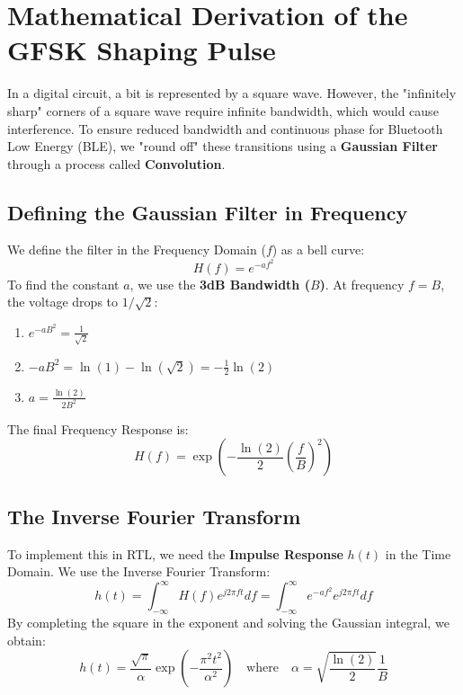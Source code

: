 \documentclass[12pt,singleside,a4paper]{report}
\begin{document}
\section{Mathematical Derivation of the GFSK Shaping Pulse }


In a digital circuit, a bit is represented by a square wave. However, the "infinitely sharp" corners of a square wave require infinite bandwidth, which would cause interference. To ensure reduced bandwidth and continuous phase for Bluetooth Low Energy (BLE), we "round off" these transitions using a \textbf{Gaussian Filter} through a process called \textbf{Convolution}.

\subsection{Defining the Gaussian Filter in Frequency}
We define the filter in the Frequency Domain ($f$) as a bell curve:
\begin{equation}
H(f) = e^{-af^2}
\end{equation}
To find the constant $a$, we use the \textbf{3dB Bandwidth ($B$)}. At frequency $f = B$, the voltage drops to $1/\sqrt{2}$:
\begin{enumerate}
    \item $e^{-aB^2} = \frac{1}{\sqrt{2}}$
    \item $-aB^2 = \ln(1) - \ln(\sqrt{2}) = -\frac{1}{2}\ln(2)$
    \item $a = \frac{\ln(2)}{2B^2}$
\end{enumerate}
The final Frequency Response is:
\begin{equation}
H(f) = \exp\left( -\frac{\ln(2)}{2} \left( \frac{f}{B} \right)^2 \right)
\end{equation}

\subsection{The Inverse Fourier Transform}
To implement this in RTL, we need the \textbf{Impulse Response} $h(t)$ in the Time Domain. We use the Inverse Fourier Transform:
\begin{equation}
h(t) = \int_{-\infty}^{\infty} H(f) e^{j2\pi ft} df = \int_{-\infty}^{\infty} e^{-af^2} e^{j2\pi ft} df
\end{equation}
By completing the square in the exponent and solving the Gaussian integral, we obtain:
\begin{equation}
h(t) = \frac{\sqrt{\pi}}{\alpha} \exp\left( -\frac{\pi^2 t^2}{\alpha^2} \right) \quad \text{where} \quad \alpha = \sqrt{\frac{\ln(2)}{2}} \frac{1}{B}
\end{equation}
\end{document}
